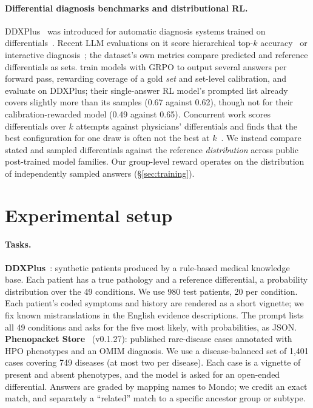 \documentclass[11pt]{article}
\begin{document}
\paragraph{Differential diagnosis benchmarks and distributional RL.}
DDXPlus~\citep{fansi2022ddxplus} was introduced for automatic diagnosis systems trained on differentials~\citep{fansi2022casande}. Recent LLM evaluations on it score hierarchical top-$k$ accuracy~\citep{h-ddx2025} or interactive diagnosis~\citep{rose2025meddxagent}; the dataset's own metrics compare predicted and reference differentials as sets.
\citet{puri2026beyondmode} train models with GRPO to output several answers per forward pass, rewarding coverage of a gold \emph{set} and set-level calibration, and evaluate on DDXPlus; their single-answer RL model's prompted list already covers slightly more than its samples (0.67 against 0.62), though not for their calibration-rewarded model (0.49 against 0.65). Concurrent work scores differentials over $k$ attempts against physicians' differentials and finds that the best configuration for one draw is often not the best at $k$~\citep{lebronnec2026vtc}.
We instead compare stated and sampled differentials against the reference \emph{distribution} across public post-trained model families.
Our group-level reward operates on the distribution of independently sampled answers (\S\ref{sec:training}).

\section{Experimental setup}\label{sec:setup}
\paragraph{Tasks.}
\textbf{DDXPlus}~\citep{fansi2022ddxplus}: synthetic patients produced by a rule-based medical knowledge base. Each patient has a true pathology and a reference differential, a probability distribution over the 49 conditions.
We use 980 test patients, 20 per condition. Each patient's coded symptoms and history are rendered as a short vignette; we fix known mistranslations in the English evidence descriptions.
The prompt lists all 49 conditions and asks for the five most likely, with probabilities, as JSON.
\textbf{Phenopacket Store}~\citep{danis2025phenopacketstore} (v0.1.27): published rare-disease cases annotated with HPO phenotypes and an OMIM diagnosis.
We use a disease-balanced set of 1,401 cases covering 749 diseases (at most two per disease). Each case is a vignette of present and absent phenotypes, and the model is asked for an open-ended differential.
Answers are graded by mapping names to Mondo; we credit an exact match, and separately a ``related'' match to a specific ancestor group or subtype.
\end{document}
